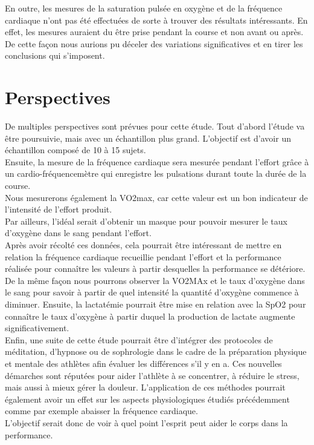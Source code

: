         En outre, les mesures de la saturation pulsée en oxygène et de la fréquence cardiaque n'ont pas été effectuées de sorte à trouver des résultats intéressants. En effet, les mesures auraient du être prise pendant la course et non avant ou après. De cette façon nous aurions pu déceler des variations significatives et en tirer les conclusions qui s'imposent.\\
        

            
    \section{Perspectives}
        
        De multiples perspectives sont prévues pour cette étude. Tout d'abord l'étude va être poursuivie, mais avec un échantillon plus grand. L'objectif est d'avoir un échantillon composé de 10 à 15 sujets.\\
     
        Ensuite, la mesure de la fréquence cardiaque sera mesurée pendant l'effort grâce à un cardio-fréquencemètre qui enregistre les pulsations durant toute la durée de la course.\\
        
        Nous mesurerons également la VO2max, car cette valeur est un bon indicateur de l'intensité de l'effort produit. \\
        
        Par ailleurs, l'idéal serait d'obtenir un masque pour pouvoir mesurer le taux d'oxygène dans le sang pendant l'effort. \\
        
        Après avoir récolté ces données, cela pourrait être intéressant de mettre en relation la fréquence cardiaque recueillie pendant l'effort et la performance réalisée pour connaître les valeurs à partir desquelles la performance se détériore. De la même façon nous pourrons observer la VO2MAx et le taux d'oxygène dans le sang pour savoir à partir de quel intensité la quantité d'oxygène commence à diminuer. Ensuite, la lactatémie pourrait être mise en relation avec la SpO2 pour connaître le taux d'oxygène à partir duquel la production de lactate augmente significativement. \\
        
        Enfin, une suite de cette étude pourrait être d'intégrer des protocoles de méditation, d'hypnose ou de sophrologie dans le cadre de la préparation physique et mentale des athlètes afin évaluer les différences s'il y en a. Ces nouvelles démarches sont réputées pour aider l'athlète à se concentrer, à réduire le stress, mais aussi à mieux gérer la douleur. L'application de ces méthodes pourrait également avoir un effet sur les aspects physiologiques étudiés précédemment comme par exemple abaisser la fréquence cardiaque.\\
        
        L'objectif serait donc de voir à quel point l'esprit peut aider le corps dans la performance.
    
    

